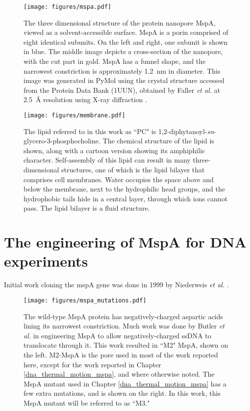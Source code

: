 \begin{figure}[h]
\begin{centering}
\texttt{[image: figures/mspa.pdf]}
\caption[The protein nanopore MspA]{The three dimensional structure of the protein nanopore MspA, viewed as a solvent-accessible surface.  MspA is a porin comprised of eight identical subunits.  On the left and right, one subunit is shown in blue.  The middle image depicts a cross-section of the nanopore, with the cut part in gold.  MspA has a funnel shape, and the narrowest constriction is approximately \SI{1.2}{\nm} in diameter.  This image was generated in PyMol using the crystal structure accessed from the Protein Data Bank (1UUN), obtained by Faller \textit{et al.} at \SI{2.5}{\angstrom} resolution using X-ray diffraction \citep{Faller2004a}.}
\label{fig:mspa}
\end{centering}
\end{figure}

\begin{figure}[h]
\begin{centering}
\texttt{[image: figures/membrane.pdf]}
\caption[Lipids and the lipid bilayer membrane]{The lipid referred to in this work as ``PC" is 1,2-diphytanoyl-\textit{sn}-glycero-3-phosphocholine.  The chemical structure of the lipid is shown, along with a cartoon version showing its amphiphilic character.  Self-assembly of this lipid can result in many three-dimensional structures, one of which is the lipid bilayer that comprises cell membranes.  Water occupies the space above and below the membrane, next to the hydrophilic head groups, and the hydrophobic tails hide in a central layer, through which ions cannot pass.  The lipid bilayer is a fluid structure.}
\label{fig:lipids}
\end{centering}
\end{figure}

\section{The engineering of MspA for DNA experiments}

Initial work cloning the mspA gene was done in 1999 by Niederweis \textit{et al.} \citep{Niederweis1999}.

\begin{figure}[h]
\begin{centering}
\texttt{[image: figures/mspa\_mutations.pdf]}
\caption[Genetic engineering of MspA]{The wild-type MspA protein has negatively-charged aspartic acids lining its narrowest constriction.  Much work was done by Butler \textit{et al.} \citep{Butler2008} in engineering MspA to allow negatively-charged ssDNA to translocate through it.  This work resulted in ``M2" MspA, shown on the left.  M2-MspA is the pore used in most of the work reported here, except for the work reported in Chapter \ref{dna_thermal_motion_mspa}, and where otherwise noted.  The MspA mutant used in Chapter \ref{dna_thermal_motion_mspa} has a few extra mutations, and is shown on the right.  In this work, this MspA mutant will be referred to as ``M3."}
\label{fig:mspa_engineering}
\end{centering}
\end{figure}

